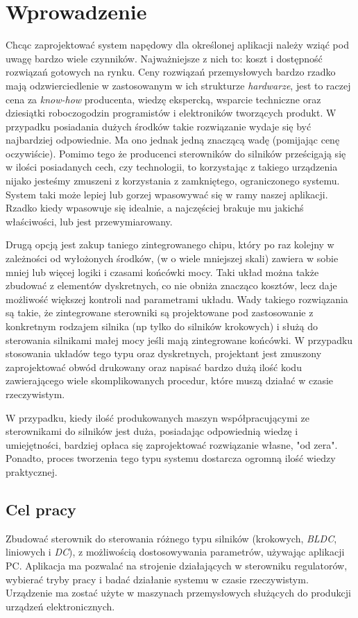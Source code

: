 \section*{Wprowadzenie}
Chcąc zaprojektować system napędowy dla określonej aplikacji należy wziąć pod uwagę bardzo wiele czynników. Najważniejsze z nich to: koszt i dostępność rozwiązań gotowych na rynku. Ceny rozwiązań przemysłowych bardzo rzadko mają odzwierciedlenie w zastosowanym w ich strukturze {\it hardwarze}, jest to raczej cena za {\it know-how} producenta, wiedzę ekspercką, wsparcie techniczne oraz dziesiątki roboczogodzin programistów i elektroników tworzących produkt. W przypadku posiadania dużych środków takie rozwiązanie wydaje się być najbardziej odpowiednie. Ma ono jednak jedną znaczącą wadę (pomijając cenę oczywiście). Pomimo tego że producenci sterowników do silników prześcigają się w ilości posiadanych cech, czy technologii, to korzystając z takiego urządzenia nijako jesteśmy zmuszeni z korzystania z zamkniętego, ograniczonego systemu. System taki może lepiej lub gorzej wpasowywać się w ramy naszej aplikacji. Rzadko kiedy wpasowuje się idealnie, a najczęściej brakuje mu jakichś właściwości, lub jest przewymiarowany. \

Drugą opcją jest zakup taniego zintegrowanego chipu, który po raz kolejny w zależności od wyłożonych środków, (w o wiele mniejszej skali) zawiera w sobie mniej lub więcej logiki i czasami końcówki mocy. Taki układ można także zbudować z elementów dyskretnych, co nie obniża znacząco kosztów, lecz daje możliwość większej kontroli nad parametrami układu. Wady takiego rozwiązania są takie, że zintegrowane sterowniki są projektowane pod zastosowanie z konkretnym rodzajem silnika (np tylko do silników krokowych) i służą do sterowania silnikami małej mocy jeśli mają zintegrowane końcówki. W przypadku stosowania układów tego typu oraz dyskretnych, projektant jest zmuszony zaprojektować obwód drukowany oraz napisać bardzo dużą ilość kodu zawierającego wiele skomplikowanych procedur, które muszą działać w czasie rzeczywistym. \

W przypadku, kiedy ilość produkowanych maszyn współpracującymi ze sterownikami do silników jest duża, posiadając odpowiednią wiedzę i umiejętności, bardziej opłaca się zaprojektować rozwiązanie własne, "od zera". Ponadto, proces tworzenia tego typu systemu dostarcza ogromną ilość wiedzy praktycznej.
  
\subsection*{Cel pracy}
Zbudować sterownik do sterowania różnego typu silników (krokowych, {\it BLDC}, liniowych i {\it DC}), z możliwością dostosowywania parametrów, używając aplikacji PC. Aplikacja ma pozwalać na strojenie działających w sterowniku regulatorów, wybierać tryby pracy i badać działanie systemu w czasie rzeczywistym. Urządzenie ma zostać użyte w maszynach przemysłowych służących do produkcji urządzeń elektronicznych.

